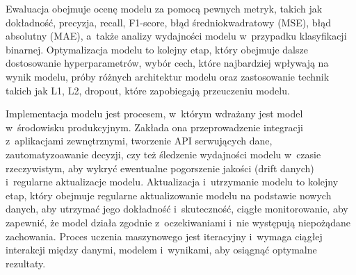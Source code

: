 Ewaluacja obejmuje ocenę modelu za pomocą pewnych metryk,
takich jak dokładność, precyzja, recall, F1-score, błąd średniokwadratowy (MSE),
błąd absolutny (MAE), a~także analizy wydajności modelu w~przypadku klasyfikacji binarnej.
Optymalizacja modelu to kolejny etap, który obejmuje dalsze dostosowanie hyperparametrów,
wybór cech, które najbardziej wpływają na wynik modelu,
próby różnych architektur modelu oraz zastosowanie technik takich jak L1, L2, dropout,
które zapobiegają przeuczeniu modelu.

Implementacja modelu jest procesem, w~którym wdrażany jest model w~środowisku produkcyjnym.
Zakłada ona przeprowadzenie integracji z~aplikacjami zewnętrznymi, tworzenie API serwujących dane,
zautomatyzoawanie decyzji, czy też śledzenie wydajności modelu w~czasie rzeczywistym,
aby wykryć ewentualne pogorszenie jakości (drift danych) i~regularne aktualizacje modelu.
Aktualizacja i~utrzymanie modelu to kolejny etap,
który obejmuje regularne aktualizowanie modelu na podstawie nowych danych,
aby utrzymać jego dokładność i~skuteczność, ciągłe monitorowanie,
aby zapewnić, że model działa zgodnie z~oczekiwaniami i~nie występują niepożądane zachowania.
Proces uczenia maszynowego jest iteracyjny i~wymaga ciągłej interakcji między danymi,
modelem i~wynikami, aby osiągnąć optymalne rezultaty.